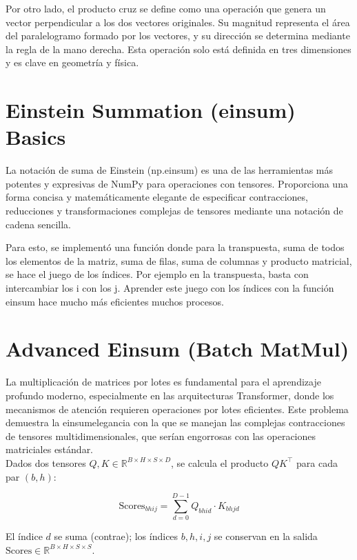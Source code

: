 \documentclass[12pt, letterpaper]{article}
\begin{document}
Por otro lado, el producto cruz se define como una operación que genera un vector perpendicular a los dos vectores originales. Su 
magnitud representa el área del paralelogramo formado por los vectores, y su dirección se determina mediante la regla de la mano 
derecha. Esta operación solo está definida en tres dimensiones y es clave en geometría y física.

\newpage

\section{Einstein Summation (einsum) Basics}

La notación de suma de Einstein (np.einsum) es una de las herramientas más potentes y expresivas de NumPy para operaciones con tensores. 
Proporciona una forma concisa y matemáticamente elegante de especificar contracciones, reducciones y transformaciones complejas de tensores mediante una notación de cadena sencilla.

Para esto, se implementó una función donde para la transpuesta, suma de todos los elementos de la matriz, suma de  filas, suma de columnas y producto matricial, se hace el juego de los 
índices. Por ejemplo en la transpuesta, basta con intercambiar los i con los j. Aprender este juego con los índices con la función einsum hace mucho más eficientes muchos procesos. 


\newpage

\section{Advanced Einsum (Batch MatMul)}

La multiplicación de matrices por lotes es fundamental para el aprendizaje profundo moderno, especialmente en las arquitecturas Transformer, donde los mecanismos 
de atención requieren operaciones por lotes eficientes. Este problema demuestra la einsumelegancia con la que se manejan las complejas contracciones 
de tensores multidimensionales, que serían engorrosas con las operaciones matriciales estándar. \\ 


Dados dos tensores $Q, K \in \mathbb{R}^{B \times H \times S \times D}$, se calcula el producto $QK^\top$ para cada par $(b, h)$:

\[
\text{Scores}_{bhij} = \sum_{d=0}^{D-1} Q_{bhid} \cdot K_{bhjd}
\]

El índice $d$ se suma (contrae); los índices $b, h, i, j$ se conservan en la salida $\text{Scores} \in \mathbb{R}^{B \times H \times S \times S}$.
\end{document}
